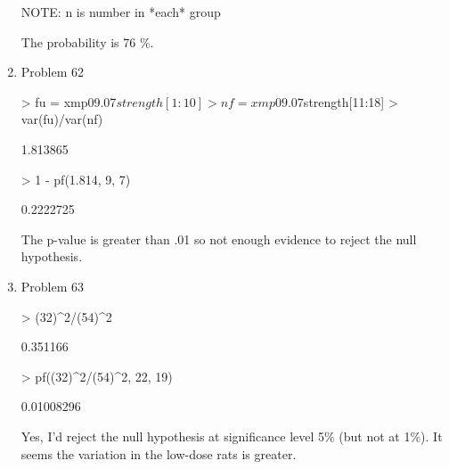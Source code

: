 \documentclass[11pt,letterpaper]{article}
\begin{document}
\begin{enumerate}
\begin{Schunk}
\begin{Soutput}
 NOTE: n is number in *each* group 
\end{Soutput}
\end{Schunk}
The probability is 76 \%.

\item Problem 62
\begin{Schunk}
\begin{Sinput}
> fu = xmp09.07$strength[1:10]
> nf = xmp09.07$strength[11:18]
> var(fu)/var(nf)
\end{Sinput}
\begin{Soutput}
[1] 1.813865
\end{Soutput}
\begin{Sinput}
> 1 - pf(1.814, 9, 7)
\end{Sinput}
\begin{Soutput}
[1] 0.2222725
\end{Soutput}
\end{Schunk}
The p-value is greater than .01 so not enough evidence to reject the null hypothesis.

\item Problem 63
\begin{Schunk}
\begin{Sinput}
> (32)^2/(54)^2
\end{Sinput}
\begin{Soutput}
[1] 0.351166
\end{Soutput}
\begin{Sinput}
> pf((32)^2/(54)^2, 22, 19)
\end{Sinput}
\begin{Soutput}
[1] 0.01008296
\end{Soutput}
\end{Schunk}
Yes, I'd reject the null hypothesis at significance level 5\% (but not at 1\%). It seems the variation in the low-dose rats is greater.

\end{enumerate}
\end{document}
